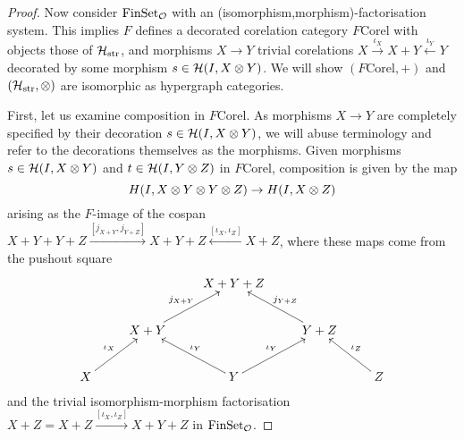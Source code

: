 \begin{proof}
  Now consider $\mathrm{FinSet}_{\mathcal O}$ with an (isomorphism,morphism)-factorisation
  system. This implies $F$ defines a decorated corelation category
  $F\mathrm{Corel}$ with objects those of $\mathcal H_{\mathrm{str}}$, and morphisms
  $X \to Y$ trivial corelations $X \xrightarrow{\iota_X} X+Y
  \xleftarrow{\iota_Y} Y$ decorated by some morphism $s \in \mathcal H(I,X\otimes Y)$. We
  will show $(F\mathrm{Corel},+)$ and $(\mathcal H_{\mathrm{str}},\otimes)$ are
  isomorphic as hypergraph categories.
  
  First, let us examine composition in $F\mathrm{Corel}$. As morphisms $X \to Y$
  are completely specified by their decoration $s \in \mathcal H(I,X\otimes Y)$, we will
  abuse terminology and refer to the decorations themselves as the morphisms.
  Given morphisms $s \in \mathcal H(I,X\otimes Y)$ and $t \in \mathcal H(I,Y\otimes Z)$ in
  $F\mathrm{Corel}$, composition is given by the map 
  \[
    H(I,X\otimes Y\otimes Y\otimes Z) \to H(I,X\otimes Z)
  \]
  arising as the $F$-image of the cospan $X+Y+Y+Z
  \xrightarrow{[j_{X+Y},j_{Y+Z}]} X+Y+Z \xleftarrow{[\iota_X,\iota_Z]} X+Z$,
  where these maps come from the pushout square
  \[
    \xymatrix{
      && X+Y+Z \\
      & X+Y \ar[ur]^{j_{X+Y}} && Y+Z \ar[ul]_{j_{Y+Z}} \\
      X \ar[ur]^{\iota_X} && Y \ar[ul]_{\iota_Y} \ar[ur]^{\iota_Y} && Z
      \ar[ul]_{\iota_Z}
    }
  \]
  and the trivial isomorphism-morphism factorisation $X+Z = X+Z
  \xrightarrow{[\iota_X,\iota_Z]} X+Y+Z$ in $\mathrm{FinSet}_{\mathcal O}$.
  

\end{proof}
